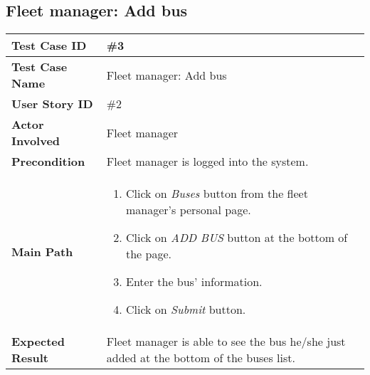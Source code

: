 \subsection{Fleet manager: Add bus}
\begin{center}
	\begin{tabular} { | m{3.5cm} | m{9.5cm} | }
		\hline
		\textbf{Test Case ID} & \#3\\
		\hline
		\textbf{Test Case Name} & Fleet manager: Add bus\\
		\hline
		\textbf{User Story ID} & \#2 \\
		\hline
		\textbf{Actor Involved} & Fleet manager\\
		\hline
		\textbf{Precondition} & Fleet manager is logged into the system.\\
		\hline
		\textbf{Main Path} & 
		\begin{enumerate}
			\item Click on \textit{Buses} button from the fleet manager's personal page.
			\item Click on \textit{ADD BUS} button at the bottom of the page.
			\item Enter the bus' information.
			\item Click on \textit{Submit} button.
		\end{enumerate}\\
		\hline
		\textbf{Expected Result} & Fleet manager is able to see the bus he/she just added at the bottom of the buses list.\\
		\hline
	\end{tabular}
\end{center}

